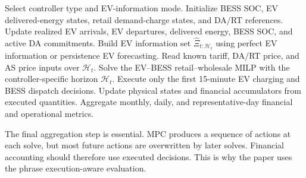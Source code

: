 \documentclass[final,5p,times]{elsarticle}
\newcommand{\calH}{\mathcal{H}}
\begin{document}
\begin{algorithm}[!t]
\caption{Execution-aware EV--BESS MPC simulation}
\label{alg:mpc_execution}
\begin{algorithmic}[1]
\STATE Select controller type and EV-information mode.
\STATE Initialize BESS SOC, EV delivered-energy states, retail demand-charge states, and DA/RT references.
    \STATE Update realized EV arrivals, EV departures, delivered energy, BESS SOC, and active DA commitments.
    \STATE Build EV information set $\widehat{\Xi}_{t:\calH_t}$ using perfect EV information or persistence EV forecasting.
    \STATE Read known tariff, DA/RT price, and AS price inputs over $\calH_t$.
    \STATE Solve the EV--BESS retail--wholesale MILP with the controller-specific horizon $\calH_t$.
    \STATE Execute only the first 15-minute EV charging and BESS dispatch decisions.
    \STATE Update physical states and financial accumulators from executed quantities.
\ENDFOR
\STATE Aggregate monthly, daily, and representative-day financial and operational metrics.
\end{algorithmic}
\end{algorithm}

The final aggregation step is essential. MPC produces a sequence of actions at each solve, but most future actions are overwritten by later solves. Financial accounting should therefore use executed decisions. This is why the paper uses the phrase execution-aware evaluation.

\end{document}

